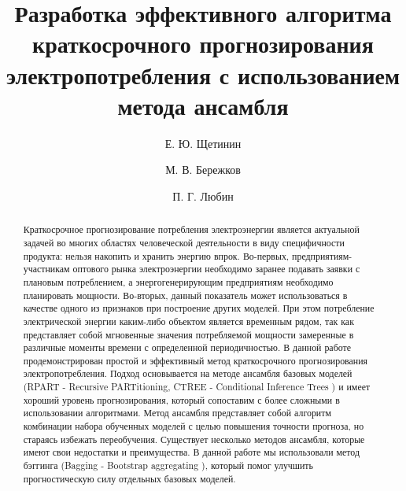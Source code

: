 \documentclass[60x84/16,8pt]{ittmm}
\begin{document}

\title{Разработка эффективного алгоритма краткосрочного прогнозирования
  электропотребления с использованием метода ансамбля}

\author[1]{Е. Ю. Щетинин}
\author[2]{М. В. Бережков}
\author[2]{П. Г. Любин}

\address[1]{Всероссийский научно-исследовательский институт\\
  по проблемам гражданской обороны  и чрезвычайных ситуаций\\
  МЧС России (федеральный центр науки и высоких технологий)\\
  ул. Давыдковская, д.7, Москва, Россия, 121352}
\address[2]{Федеральное государственное бюджетное образовательное учреждение\\
  Высшего образования\\
  Московский государственный технологический университет ``СТАНКИН''\\
  пер. Вадковский, д.3а, Москва, Россия, 127055}


\begin{abstract}
Краткосрочное прогнозирование потребления электроэнергии является актуальной
задачей во многих областях человеческой деятельности в виду специфичности
продукта: нельзя накопить и хранить энергию впрок. Во-первых,
предприятиям-участникам оптового рынка электроэнергии необходимо заранее
подавать заявки с плановым потреблением, а энергогенерирующим предприятиям
необходимо планировать мощности. Во-вторых, данный показатель может
использоваться в качестве одного из признаков при построение других моделей. При
этом потребление электрической энергии каким-либо объектом является временным
рядом, так как представляет собой мгновенные значения потребляемой мощности
замеренные в различные моменты времени с определенной периодичностью. В данной
работе продемонстрирован простой и эффективный метод краткосрочного
прогнозирования электропотребления. Подход основывается на методе ансамбля
базовых моделей (RPART - Recursive PARTitioning, CTREE - Conditional Inference
Trees \cite{BreimanEtAl}) и имеет хороший уровень прогнозирования, который
сопоставим с более сложными в использовании алгоритмами. Метод ансамбля
представляет собой алгоритм комбинации набора обученных моделей с целью
повышения точности прогноза, но стараясь избежать переобучения. Существует
несколько методов ансамбля, которые имеют свои недостатки и преимущества. В
данной работе мы использовали метод бэггинга (Bagging - Bootstrap aggregating
\cite{Breiman1996}), который помог улучшить прогностическую силу отдельных
базовых моделей.
\end{abstract}
\end{document}
